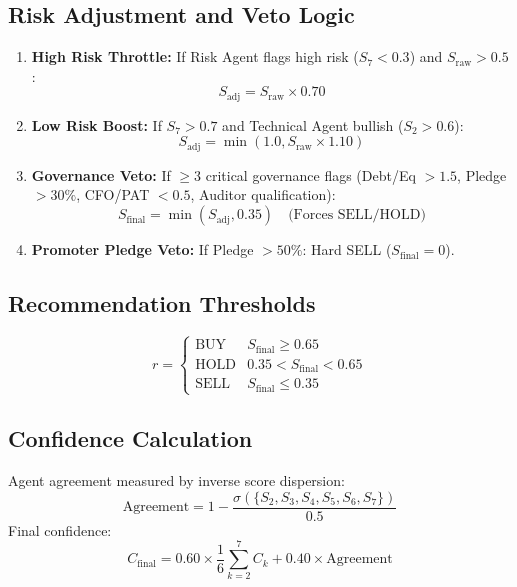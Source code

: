 \documentclass[12pt,a4paper]{report}
\begin{document}
\subsection{Risk Adjustment and Veto Logic}
\begin{enumerate}
\item \textbf{High Risk Throttle:} If Risk Agent flags high risk ($S_7 < 0.3$) and $S_{\text{raw}} > 0.5$:
\begin{equation}
S_{\text{adj}} = S_{\text{raw}} \times 0.70
\end{equation}
\item \textbf{Low Risk Boost:} If $S_7 > 0.7$ and Technical Agent bullish ($S_2 > 0.6$):
\begin{equation}
S_{\text{adj}} = \min(1.0, S_{\text{raw}} \times 1.10)
\end{equation}
\item \textbf{Governance Veto:} If $\ge 3$ critical governance flags (Debt/Eq $> 1.5$, Pledge $> 30\%$, CFO/PAT $< 0.5$, Auditor qualification):
\begin{equation}
S_{\text{final}} = \min(S_{\text{adj}}, 0.35) \quad \text{(Forces SELL/HOLD)}
\end{equation}
\item \textbf{Promoter Pledge Veto:} If Pledge $> 50\%$: Hard SELL ($S_{\text{final}} = 0$).
\end{enumerate}

\subsection{Recommendation Thresholds}
\begin{equation}
r =
\begin{cases}
\text{BUY} & S_{\text{final}} \ge 0.65 \\
\text{HOLD} & 0.35 < S_{\text{final}} < 0.65 \\
\text{SELL} & S_{\text{final}} \le 0.35
\end{cases}
\end{equation}

\subsection{Confidence Calculation}
Agent agreement measured by inverse score dispersion:
\begin{equation}
\text{Agreement} = 1 - \frac{\sigma(\{S_2, S_3, S_4, S_5, S_6, S_7\})}{0.5}
\end{equation}
Final confidence:
\begin{equation}
C_{\text{final}} = 0.60 \times \frac{1}{6}\sum_{k=2}^7 C_k + 0.40 \times \text{Agreement}
\end{equation}
\end{document}
